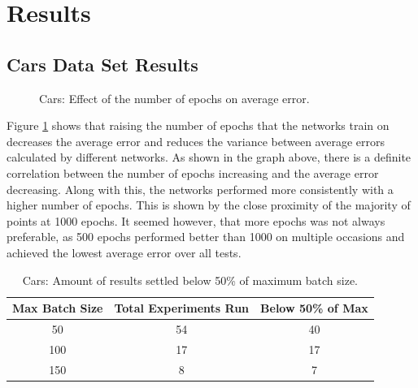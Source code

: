 \documentclass[10pt, conference, compsocconf]{IEEEtran}
\begin{document}
\section{Results}

\subsection{Cars Data Set Results}

\begin{figure}
\begin{center}
\end{center}
\caption{Cars: Effect of the number of epochs on average error.}
\label{fig:CarsNumEpochs}
\end{figure}

Figure \ref{fig:CarsNumEpochs} shows that raising the number of epochs that the networks train on decreases the average error and reduces the variance between average errors calculated by different networks. As shown in the graph above, there is a definite correlation between the number of epochs increasing and the average error decreasing. Along with this, the networks performed more consistently with a higher number of epochs. This is shown by the close proximity of the majority of points at 1000 epochs. It seemed however, that more epochs was not always preferable, as 500 epochs performed better than 1000 on multiple occasions and achieved the lowest average error over all tests.

\begin{table}
\caption{Cars: Amount of results settled below 50\% of maximum batch size.}
\label{tbl:CarsBatchSize}
\centering
\begin{tabular}{c c c}
\hline
Max Batch Size & Total Experiments Run & Below 50\% of Max \\
\hline
50 & 54 & 40 \\
100 & 17 & 17 \\
150 & 8 & 7 \\
\hline
\end{tabular}
\end{table}
\end{document}
